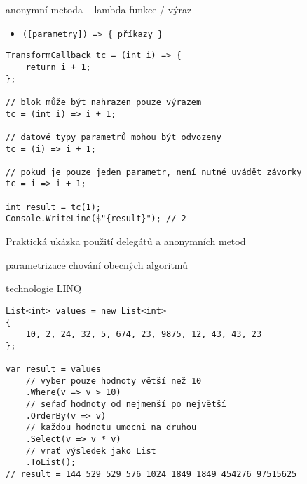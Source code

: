 \begin{frame}[fragile]
\begin{bitemize}{}
\item anonymní metoda -- lambda funkce / výraz
\begin{itemize}
\item \lstinline|([parametry]) => { příkazy }|
\end{itemize}
\end{bitemize}
\vfill
\begin{yesblock}
\begin{lstlisting}
TransformCallback tc = (int i) => {
    return i + 1;
};

// blok může být nahrazen pouze výrazem
tc = (int i) => i + 1;

// datové typy parametrů mohou být odvozeny
tc = (i) => i + 1;

// pokud je pouze jeden parametr, není nutné uvádět závorky
tc = i => i + 1;

int result = tc(1);
Console.WriteLine($"{result}"); // 2
\end{lstlisting}
\end{yesblock}
\end{frame}







\begin{frame}[fragile]
\begin{bitemize}{Praktická ukázka použití delegátů a anonymních metod}
\item parametrizace chování obecných algoritmů
\item technologie LINQ
\end{bitemize}
\vfill
\begin{yesblock}
\begin{lstlisting}
List<int> values = new List<int>
{
    10, 2, 24, 32, 5, 674, 23, 9875, 12, 43, 43, 23
};

var result = values
    // vyber pouze hodnoty větší než 10
    .Where(v => v > 10)
    // seřaď hodnoty od nejmenší po největší
    .OrderBy(v => v)
    // každou hodnotu umocni na druhou
    .Select(v => v * v)
    // vrať výsledek jako List
    .ToList();
// result = 144 529 529 576 1024 1849 1849 454276 97515625
\end{lstlisting}
\end{yesblock}
\end{frame}



\nezkouskove

